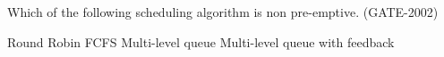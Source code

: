
\begin{questyle}

  \question  Which of the following scheduling algorithm is non pre-emptive. (GATE-2002)

  \begin{choices}
    \choice Round Robin
    \CorrectChoice FCFS
    \choice Multi-level queue
    \choice Multi-level queue with feedback
  \end{choices}

  \end{questyle}




